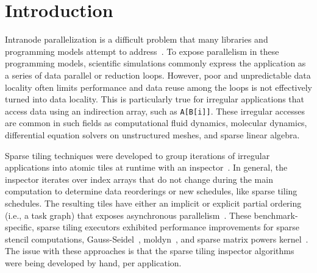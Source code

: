 \section{Introduction}
\label{sec:intro}
Intranode parallelization is a difficult problem that many libraries and programming models attempt 
to address~\citep{ST-ASCRExascaleLethin}.
To expose parallelism in these programming models, 
scientific simulations commonly express the application as a series of 
data parallel or reduction loops. 
However, poor and unpredictable data locality often limits performance and 
data reuse among the loops is not effectively turned into data locality.
This is particularly true for irregular applications that access data 
using an indirection array, such as \texttt{A[B[i]]}. 
These irregular accesses are common in such fields as computational 
fluid dynamics, molecular dynamics, differential equation solvers on unstructured meshes, and sparse linear algebra.

Sparse tiling techniques were developed to group iterations of irregular applications
into atomic tiles at runtime with an 
inspector~\citep{ST-dimeEtna00,ST-StroutIJHPCA,ST-StroutPLDI03,ST-commAvoidingSparse2009}.
In general, the inspector iterates over index arrays that do not change during
the main computation to determine data reorderings or new schedules, like
sparse tiling schedules.
The resulting tiles have either an implicit or explicit partial ordering (i.e., a task graph)
that exposes asynchronous parallelism~\citep{ST-Adams99c,ST-dimeEtna00,ST-StroutLCPC2002}.
These benchmark-specific, sparse tiling executors
exhibited performance improvements for sparse stencil computations, 
Gauss-Seidel~\citep{ST-Adams99c,ST-StroutIJHPCA}, moldyn~\citep{ST-StroutPLDI03},
and sparse matrix powers kernel~\citep{ST-commAvoidingSparse2009}.
The issue with these approaches is that the sparse tiling inspector algorithms
were being developed by hand, per application.

